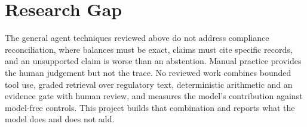 \section{Research Gap}
The general agent techniques reviewed above do not address compliance reconciliation, where
balances must be exact, claims must cite specific records, and an unsupported claim is worse than
an abstention. Manual practice provides the human judgement but not the trace. No reviewed work
combines bounded tool use, graded retrieval over regulatory text, deterministic arithmetic and an
evidence gate with human review, and measures the model's contribution against model-free
controls. This project builds that combination and reports what the model does and does not add.
